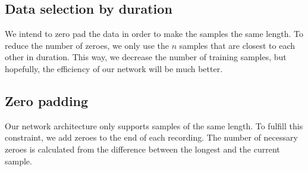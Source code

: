 \documentclass[12pt]{article}
\begin{document}
	\subsection{Data selection by duration} \label{sel_dur}
	We intend to zero pad the data in order to make the samples the same length. To reduce the number of zeroes, we only use the $n$ samples that are closest to each other in duration. This way, we decrease the number of training samples, but hopefully, the efficiency of our network will be much better.
	
	\subsection{Zero padding} \label{pad}
	Our network architecture only supports samples of the same length. To fulfill this constraint, we add zeroes to the end of each recording. The number of necessary zeroes is calculated from the difference between the longest and the current sample.
	
\end{document}
